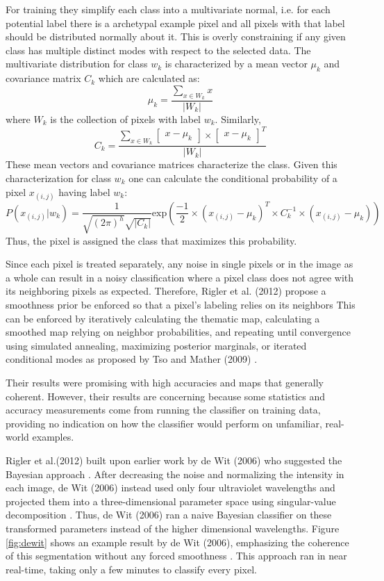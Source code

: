 \documentclass[twoside]{report}
\begin{document}
For training they simplify each class into a multivariate normal, i.e. for each potential label there is a archetypal example pixel and all pixels with that label should be distributed normally about it. This is overly constraining if any given class has multiple distinct modes with respect to the selected data. The multivariate distribution for class $w_k$ is characterized by a mean vector $\mu_k$ and covariance matrix $C_k$ which are calculated as:
\[ \mu_k = \frac{\sum_{x \in W_k} x}{|W_k|} \]
where $W_k$ is the collection of pixels with label $w_k$. Similarly,
\[ C_k = \frac{\sum_{x \in W_k} \begin{bmatrix} x - \mu_k \end{bmatrix} \times \begin{bmatrix} x - \mu_k \end{bmatrix}^T}{|W_k|} \]
These mean vectors and covariance matrices characterize the class. Given this characterization for class $w_k$ one can calculate the conditional probability of a pixel $x_{(i,j)}$ having label $w_k$:
\[ P(x_{(i,j)} | w_k) = \frac{1}{\sqrt{(2 \pi)^h} \sqrt{|C_k|}} \mathrm{exp} \left( \frac{-1}{2} \times \left(x_{(i,j)} - \mu_k \right)^T \times C_k^{-1} \times \left(x_{(i,j)} - \mu_k \right) \right) \]
Thus, the pixel is assigned the class that maximizes this probability.

Since each pixel is treated separately, any noise in single pixels or in the image as a whole can result in a noisy classification where a pixel class does not agree with its neighboring pixels as expected. Therefore, Rigler et al. (2012) propose a smoothness prior be enforced so that a pixel's labeling relies on its neighbors This can be enforced by iteratively calculating the thematic map, calculating a smoothed map relying on neighbor probabilities, and repeating until convergence using simulated annealing, maximizing posterior marginals, or iterated conditional modes as proposed by Tso and Mather (2009) \cite{tso:2009}. 

Their results were promising with high accuracies and maps that generally coherent. However, their results are concerning because some statistics and accuracy measurements come from running the classifier on training data, providing no indication on how the classifier would perform on unfamiliar, real-world examples. 

Rigler et al.(2012) built upon earlier work by de Wit (2006) who suggested the Bayesian approach \cite{dewit:2006}. After decreasing the noise and normalizing the intensity in each image, de Wit (2006) instead used only four ultraviolet wavelengths and projected them into a three-dimensional parameter space using singular-value decomposition \cite{dewit:2006}. Thus, de Wit (2006) ran a naive Bayesian classifier on these transformed parameters instead of the higher dimensional wavelengths. Figure \ref{fig:dewit} shows an example result by de Wit (2006), emphasizing the coherence of this segmentation without any forced smoothness \cite{dewit:2006}. This approach ran in near real-time, taking only a few minutes to classify every pixel. 
\end{document}
